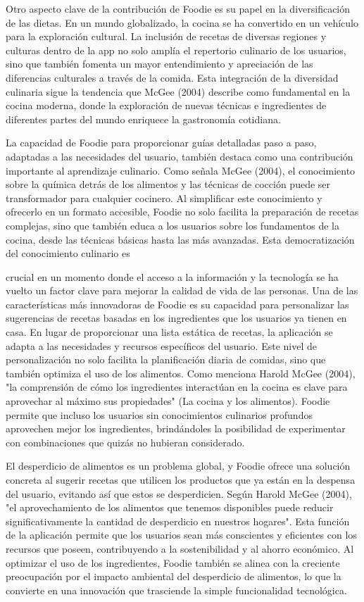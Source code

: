 \documentclass[a4paper,12pt]{article}
\begin{document}
Otro aspecto clave de la contribución de Foodie es su papel en la diversificación de las dietas. En un mundo globalizado, la cocina se ha convertido en un vehículo para la exploración cultural. La inclusión de recetas de diversas regiones y culturas dentro de la app no solo amplía el repertorio culinario de los usuarios, sino que también fomenta un mayor entendimiento y apreciación de las diferencias culturales a través de la comida. Esta integración de la diversidad culinaria sigue la tendencia que McGee (2004) describe como fundamental en la cocina moderna, donde la exploración de nuevas técnicas e ingredientes de diferentes partes del mundo enriquece la gastronomía cotidiana.

La capacidad de Foodie para proporcionar guías detalladas paso a paso, adaptadas a las necesidades del usuario, también destaca como una contribución importante al aprendizaje culinario. Como señala McGee (2004), el conocimiento sobre la química detrás de los alimentos y las técnicas de cocción puede ser transformador para cualquier cocinero. Al simplificar este conocimiento y ofrecerlo en un formato accesible, Foodie no solo facilita la preparación de recetas complejas, sino que también educa a los usuarios sobre los fundamentos de la cocina, desde las técnicas básicas hasta las más avanzadas. Esta democratización del conocimiento culinario es
 
crucial en un momento donde el acceso a la información y la tecnología se ha vuelto un factor clave para mejorar la calidad de vida de las personas.
Una de las características más innovadoras de Foodie es su capacidad para personalizar las sugerencias de recetas basadas en los ingredientes que los usuarios ya tienen en casa. En lugar de proporcionar una lista estática de recetas, la aplicación se adapta a las necesidades y recursos específicos del usuario. Este nivel de personalización no solo facilita la planificación diaria de comidas, sino que también optimiza el uso de los alimentos. Como menciona Harold McGee (2004), "la comprensión de cómo los ingredientes interactúan en la cocina es clave para aprovechar al máximo sus propiedades" (La cocina y los alimentos). Foodie permite que incluso los usuarios sin conocimientos culinarios profundos aprovechen mejor los ingredientes, brindándoles la posibilidad de experimentar con combinaciones que quizás no hubieran considerado.

El desperdicio de alimentos es un problema global, y Foodie ofrece una solución concreta al sugerir recetas que utilicen los productos que ya están en la despensa del usuario, evitando así que estos se desperdicien. Según Harold McGee (2004), "el aprovechamiento de los alimentos que tenemos disponibles puede reducir significativamente la cantidad de desperdicio en nuestros hogares". Esta función de la aplicación permite que los usuarios sean más conscientes y eficientes con los recursos que poseen, contribuyendo a la sostenibilidad y al ahorro económico. Al optimizar el uso de los ingredientes, Foodie también se alinea con la creciente preocupación por el impacto ambiental del desperdicio de alimentos, lo que la convierte en una innovación que trasciende la simple funcionalidad tecnológica.
\end{document}
